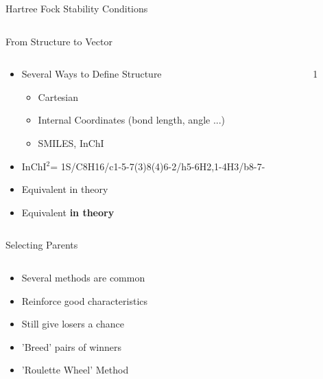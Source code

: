 \documentclass[10pt]{beamer}
\begin{document}
{{{\begin{frame}{Hartree Fock Stability Conditions}
\begin{columns}[c]
\begin{column}{.48\textwidth}
		\end{column}
		\hfill
		\begin{column}{0.48\textwidth}

		\end{column}	
	\end{columns}
\end{frame}
}

{%
\begin{frame}{From Structure to Vector}
	\begin{columns}[c] %
		\begin{column}{.48\textwidth}
			\begin{itemize}
				\item<1-> {Several Ways to Define Structure
					\begin{itemize}
						\item[] {Cartesian}
						\item[] {Internal Coordinates (bond length, angle ...)}
						\item[] {SMILES, InChI}
					\end{itemize}
				}
				\item<2-> {InChI$^2$= 1S/C8H16/c1-5-7(3)8(4)6-2/h5-6H2,1-4H3/b8-7-}
				\item<only@3> {Equivalent in theory}
				\item<only@4> {Equivalent \alert{\textbf{in theory}}}
			\end{itemize}			
		\end{column}
		\hfill
		\begin{column}{0.48\textwidth}
			1
		\end{column}	
	\end{columns}
\end{frame}
}


\begin{frame}{Selecting Parents}
	\begin{columns}[c] %
		\begin{column}{.48\textwidth}
			\begin{itemize}[<+->]
				\item {Several methods are common}
				\item {Reinforce good characteristics}
				\item {Still give losers a chance}
				\item {'Breed' pairs of winners}
				\item {'Roulette Wheel' Method}
			\end{itemize}				
		\end{column}
		\hfill
		\begin{column}{0.48\textwidth}


\end{column}
\end{columns}
\end{frame}}}
\end{document}
